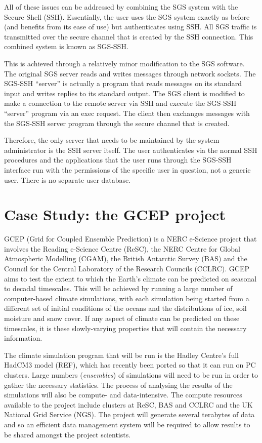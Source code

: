 \documentclass[a4paper]{article}
\begin{document}
\begin{multicols}{2}
All of these issues can be addressed by combining the SGS system with the Secure Shell (SSH).  Essentially, the user uses the SGS system exactly as before (and benefits from its ease of use) but authenticates using SSH.  All SGS traffic is transmitted over the secure channel that is created by the SSH connection.  This combined system is known as SGS-SSH.

This is achieved through a relatively minor modification to the SGS software.  The original SGS server reads and writes messages through network sockets.  The SGS-SSH ``server'' is actually a program that reads messages on its standard input and writes replies to its standard output.  The SGS client is modified to make a connection to the remote server via SSH and execute the SGS-SSH ``server'' program via an exec request.  The client then exchanges messages with the SGS-SSH server program through the secure channel that is created.

Therefore, the only server that needs to be maintained by the system administrator is the SSH server itself.  The user authenticates via the normal SSH procedures and the applications that the user runs through the SGS-SSH interface run with the permissions of the specific user in question, not a generic user.  There is no separate user database.

\section{Case Study: the GCEP project}
GCEP (Grid for Coupled Ensemble Prediction) is a NERC e-Science project that involves the Reading e-Science Centre (ReSC), the NERC Centre for Global Atmospheric Modelling (CGAM), the British Antarctic Survey (BAS) and the Council for the Central Laboratory of the Research Councils (CCLRC).  GCEP aims to test the extent to which the Earth's climate can be predicted on seasonal to decadal timescales.  This will be achieved by running a large number of computer-based climate simulations, with each simulation being started from a different set of initial conditions of the oceans and the distributions of ice, soil moisture and snow cover.  If any aspect of climate can be predicted on these timescales, it is these slowly-varying properties that will contain the necessary information.

The climate simulation program that will be run is the Hadley Centre's full HadCM3 model (REF), which has recently been ported so that it can run on PC clusters.  Large numbers ({\em ensembles\/}) of simulations will need to be run in order to gather the necessary statistics.  The process of analysing the results of the simulations will also be compute- and data-intensive.  The compute resources available to the project include clusters at ReSC, BAS and CCLRC and the UK National Grid Service (NGS).  The project will generate several terabytes of data and so an efficient data management system will be required to allow results to be shared amongst the project scientists.


\end{multicols}
\end{document}
